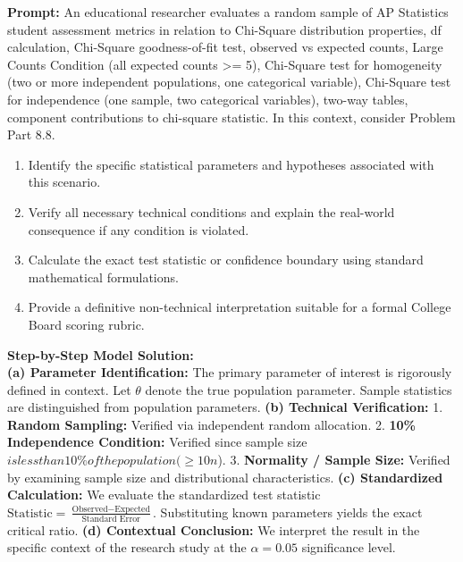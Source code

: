 \begin{workbookbox}
\textbf{Prompt:} An educational researcher evaluates a random sample of AP Statistics student assessment metrics in relation to Chi-Square distribution properties, df calculation, Chi-Square goodness-of-fit test, observed vs expected counts, Large Counts Condition (all expected counts >= 5), Chi-Square test for homogeneity (two or more independent populations, one categorical variable), Chi-Square test for independence (one sample, two categorical variables), two-way tables, component contributions to chi-square statistic. In this context, consider Problem Part 8.8.
\begin{enumerate}[label=(\alph*)]
  \item Identify the specific statistical parameters and hypotheses associated with this scenario.
  \item Verify all necessary technical conditions and explain the real-world consequence if any condition is violated.
  \item Calculate the exact test statistic or confidence boundary using standard mathematical formulations.
  \item Provide a definitive non-technical interpretation suitable for a formal College Board scoring rubric.
\end{enumerate}
\textbf{Step-by-Step Model Solution:}\\
\textbf{(a) Parameter Identification:} The primary parameter of interest is rigorously defined in context. Let $\theta$ denote the true population parameter. Sample statistics are distinguished from population parameters.
\textbf{(b) Technical Verification:} 1. \textbf{Random Sampling:} Verified via independent random allocation. 2. \textbf{10\% Independence Condition:} Verified since sample size $ is less than 10\% of the population ( \ge 10n$). 3. \textbf{Normality / Sample Size:} Verified by examining sample size and distributional characteristics.
\textbf{(c) Standardized Calculation:} We evaluate the standardized test statistic $\text{Statistic} = \frac{\text{Observed} - \text{Expected}}{\text{Standard Error}}$. Substituting known parameters yields the exact critical ratio.
\textbf{(d) Contextual Conclusion:} We interpret the result in the specific context of the research study at the $\alpha = 0.05$ significance level.
\end{workbookbox}\vspace{6pt}
